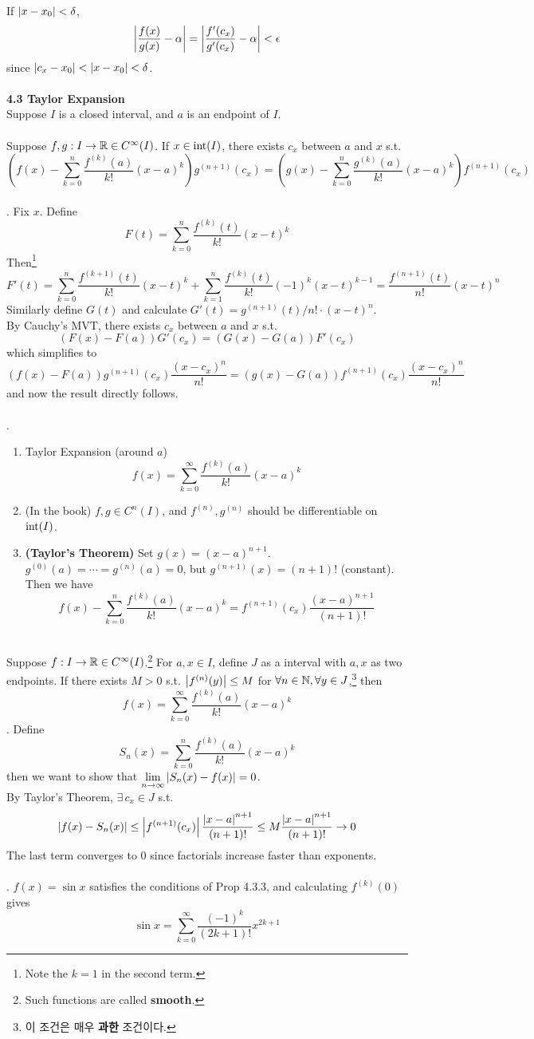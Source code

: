 If $\left|x - x_0\right| < \delta$, 
$$\left|\frac{f(x)}{g(x)} - \alpha\right| = \left|\frac{f'(c_x)}{g'(c_x)} - \alpha\right| < \epsilon$$
since $\left|c_x - x_0\right| < \left|x - x_0\right| < \delta$.\\
\\
\textbf{4.3 Taylor Expansion}\\
Suppose $I$ is a closed interval, and $a$ is an endpoint of $I$.\\
\\
 Suppose $f, g:I\rightarrow \mathbb{R} \in C^\infty(I)$. If $x\in \mathrm{int} (I)$, there exists $c_x$ between $a$ and $x$ s.t. $$ \left(f(x) - \sum_{k =0}^n \frac{f^{(k)}(a)}{k!}(x-a)^k\right)g^{(n+1)}(c_x) = \left(g(x) - \sum_{k =0}^n \frac{g^{(k)}(a)}{k!}(x-a)^k\right)f^{(n+1)}(c_x)$$
\\
\pf. Fix $x$. Define $$F(t) = \sum_{k =0}^n \frac{f^{(k)}(t)}{k!}(x-t)^k$$
Then\footnote{Note the $k=1$ in the second term.} $$F'(t) = \sum_{k =0}^n \frac{f^{(k+1)}(t)}{k!}(x-t)^k + \sum_{k =1}^n \frac{f^{(k)}(t)}{k!}(-1)^k(x-t)^{k-1} = \frac{f^{(n+1)}(t)}{n!}(x-t)^n$$
Similarly define $G(t)$ and calculate $G'(t) = g^{(n+1)}(t) / n! \cdot (x-t)^n$.\\
By Cauchy's MVT, there exists $c_x$ between $a$ and $x$ s.t. $$(F(x) - F(a))G'(c_x) = (G(x) - G(a))F'(c_x)$$
which simplifies to $$(f(x) - F(a))g^{(n+1)}(c_x)\frac{(x-c_x)^n}{n!} = (g(x) - G(a))f^{(n+1)}(c_x)\frac{(x-c_x)^n}{n!}$$
and now the result directly follows.\\
\\
\rmk.
\begin{enumerate}
	\item Taylor Expansion (around $a$)
	$$f(x) = \sum_{k=0}^\infty \frac{f^{(k)}(a)}{k!}(x-a)^k$$
	\item (In the book) $f, g \in C^n(I)$, and $f^{(n)}, g^{(n)}$ should be differentiable on $\mathrm{int}(I)$. 
	\item \textbf{(Taylor's Theorem)} Set $g(x) = (x-a)^{n+1}$. $g^{(0)}(a) = \cdots = g^{(n)}(a) =0$, but $g^{(n+1)}(x) = (n+1)! $ (constant). Then we have 
	$$f(x) - \sum_{k =0}^n \frac{f^{(k)}(a)}{k!}(x-a)^k = f^{(n+1)}(c_x) \frac{(x-a)^{n+1}}{(n+1)!}$$
\end{enumerate}~\\
 Suppose $f:I\rightarrow \mathbb{R} \in C^{\infty}(I)$.\footnote{Such functions are called \textbf{smooth}.} For $a, x\in I$, define $J$ as a interval with $a, x$ as two endpoints. If there exists $M > 0$ s.t. $\left|f^{(n)}(y)\right| \leq M$ for $\forall n\in \mathbb{N}, \forall y\in J$,\footnote{이 조건은 매우 \textbf{과한} 조건이다.} then $$f(x) = \sum_{k=0}^\infty \frac{f^{(k)}(a)}{k!}(x-a)^k$$
\pf. Define $$S_n(x) = \sum_{k=0}^n \frac{f^{(k)}(a)}{k!}(x-a)^k$$
then we want to show that $\displaystyle \lim_{n\rightarrow\infty} \left|S_n(x) - f(x)\right| = 0$.\\
By Taylor's Theorem, $\exists\,c_x \in J$ s.t. $$\left|f(x) - S_n(x)\right| \leq \left|f^{(n+1)}(c_x)\right|\frac{\left|x-a\right|^{n+1}}{(n+1)!} \leq M \frac{\left|x-a\right|^{n+1}}{(n+1)!} \rightarrow 0$$
The last term converges to $0$ since factorials increase faster than exponents.\\
\\
\ex. $f(x) = \sin x$ satisfies the conditions of Prop 4.3.3, and calculating $f^{(k)}(0)$ gives $$\sin x = \sum_{k=0}^\infty \frac{(-1)^k}{(2k+1)!}x^{2k+1}$$

\pagebreak